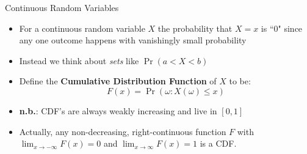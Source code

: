 \documentclass[aspectratio=169,11pt]{beamer}
\begin{document}
\begin{frame}{Continuous Random Variables}
\begin{itemize}
	\item For a continuous random variable $X$ the probability that $X=x$ is ``0" since any one outcome happens with vanishingly small probability
	\item Instead we think about \emph{sets} like $\Pr(a<X<b)$
	\item Define the {\bf Cumulative Distribution Function} of $X$ to be:
		\[
			F(x) = \Pr(\omega: X\left(\omega\right) \leq x)
		\]
	\item {\bf n.b.}: CDF's are always weakly increasing and live in $\left[0,1\right]$
	\item Actually, any non-decreasing, right-continuous function $F$ with $\lim_{x\rightarrow-\infty}F\left(x\right)=0$ and $\lim_{x\rightarrow\infty}F\left(x\right)=1$ 
	 	is a CDF.
\end{itemize}
\end{frame}
\end{document}
